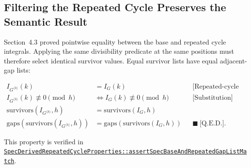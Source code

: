 \subsection{Filtering the Repeated Cycle Preserves the Semantic Result}
\label{sec:filtering-repeated-cycle-preserves-result}

Section~4.3 proved pointwise equality between the base and repeated cycle
integrals. Applying the same divisibility predicate at the same positions
must therefore select identical survivor values. Equal survivor lists
have equal adjacent-gap lists:

\begin{equation*}
\begin{aligned}
I_{G^{\langle h\rangle}}(k)&=I_G(k)
  &&\text{[Repeated-cycle equality]} \\
I_{G^{\langle h\rangle}}(k)\not\equiv0\pmod h
&\Longleftrightarrow I_G(k)\not\equiv0\pmod h
  &&\text{[Substitution]} \\
\text{survivors}(I_{G^{\langle h\rangle}},h)
&=\text{survivors}(I_G,h) \\
\text{gaps}(\text{survivors}(I_{G^{\langle h\rangle}},h))
&=\text{gaps}(\text{survivors}(I_G,h))
  &&\blacksquare\ \text{[Q.E.D.]}.
\end{aligned}
\end{equation*}

{\raggedright
This property is verified in
\href{https://github.com/thiagomata/prime-numbers/blob/master/src/main/scala/v1/chapter6/sieve/seq/spec/properties/SpecDerivedRepeatedCycleProperties.scala}{\texttt{SpecDerivedRepeatedCycleProperties::assertSpecBaseAndRepeatedGapListMatch}}.
\par}
